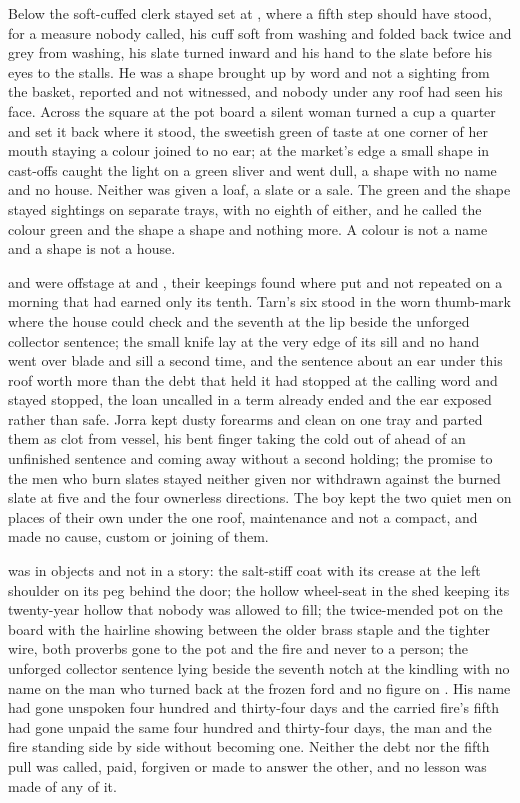 Below  the soft-cuffed clerk stayed set at , where a fifth step should have stood, for a measure nobody called, his cuff soft from washing and folded back twice and grey from washing, his slate turned inward and his hand to the slate before his eyes to the stalls. He was a shape brought up by word and not a sighting from the basket, reported and not witnessed, and nobody under any roof had seen his face. Across the square at the pot board a silent woman turned a cup a quarter and set it back where it stood, the sweetish green of taste at one corner of her mouth staying a colour joined to no ear; at the market's edge a small shape in cast-offs caught the light on a green sliver and went dull, a shape with no name and no house. Neither was given a loaf, a slate or a sale. The green and the shape stayed sightings on separate trays, with no eighth of either, and he called the colour green and the shape a shape and nothing more. A colour is not a name and a shape is not a house.

 and  were offstage at  and , their keepings found where put and not repeated on a morning that had earned only its tenth. Tarn's six stood in the worn thumb-mark where the house could check and the seventh at the lip beside the unforged collector sentence; the small knife lay at the very edge of its sill and no hand went over blade and sill a second time, and the sentence about an ear under this roof worth more than the debt that held it had stopped at the calling word and stayed stopped, the loan uncalled in a term already ended and the ear exposed rather than safe. Jorra kept dusty forearms and clean on one tray and parted them as clot from vessel, his bent finger taking the cold out of  ahead of an unfinished sentence and coming away without a second holding; the promise to the men who burn slates stayed neither given nor withdrawn against the burned slate at five and the four ownerless directions. The boy kept the two quiet men on places of their own under the one roof, maintenance and not a compact, and made no cause, custom or joining of them.

 was in objects and not in a story: the salt-stiff coat with its crease at the left shoulder on its peg behind the door; the hollow wheel-seat in the shed keeping its twenty-year hollow that nobody was allowed to fill; the twice-mended pot on the board with the hairline showing between the older brass staple and the tighter wire, both proverbs gone to the pot and the fire and never to a person; the unforged collector sentence lying beside the seventh notch at the kindling with no name on the man who turned back at the frozen ford and no figure on . His name had gone unspoken four hundred and thirty-four days and the carried fire's fifth had gone unpaid the same four hundred and thirty-four days, the man and the fire standing side by side without becoming one. Neither the debt nor the fifth pull was called, paid, forgiven or made to answer the other, and no lesson was made of any of it.

